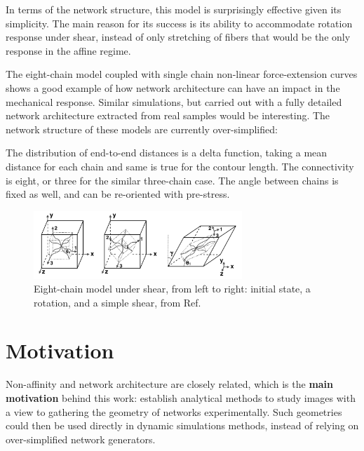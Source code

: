 In terms of the network structure, this model is surprisingly effective given its simplicity. The main reason for its success is its ability to accommodate rotation response under shear, instead of only stretching of fibers that would be the only response in the affine regime.

The eight-chain model coupled with single chain non-linear force-extension curves shows a good example of how network architecture can have an impact in the mechanical response. Similar simulations, but carried out with a fully detailed network architecture extracted from real samples would be interesting. The network structure of these models are currently over-simplified:

The distribution of end-to-end distances is a delta function, taking a mean distance for each chain and same is true for the contour length.
The connectivity is eight, or three for the similar three-chain case.
The angle between chains is fixed as well, and can be re-oriented with pre-stress.


\begin{figure}[ht]
  \centering
  \includegraphics[width=0.7\textwidth]{Figures/chapter-intro/eight_chain_shear_nolabels.png}
  \caption{Eight-chain model under shear, from left to right: initial state, a rotation, and a simple shear, from Ref. \textcite{palmer_constitutive_2008} }
  \label{fig:eight_chain_shear}
\end{figure}



\section{Motivation}%
\label{sec:motivation-intro}
Non-affinity and network architecture are closely related, which
is the \textbf{main motivation} behind this work: establish analytical methods to study images with a view to gathering
the geometry of networks experimentally. Such geometries could then be used directly in dynamic simulations methods, instead of relying on over-simplified network generators.

